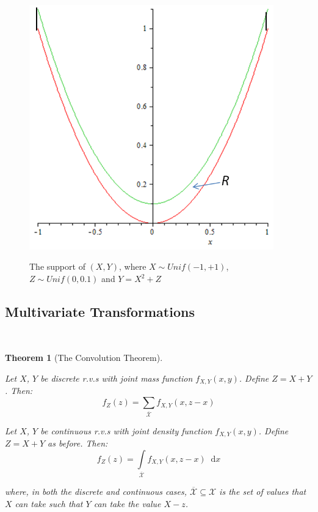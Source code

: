 \documentclass[12pt,a4paper]{article}
\newcommand{\diff}{\;\mathrm{d}}
\newtheorem{thm}{Theorem}[subsection]
\begin{document}
\begin{figure}[h]
\begin{center}
\includegraphics[height=10.58cm,width=10.58cm]{M2S1 Uncorrelated but Dependent.png}\label{figure uncorrelated, dependent}
\caption{The support of $(X,Y)$, where $X \sim Unif(-1,+1)$, $Z \sim Unif(0,0.1)$ and $Y = X^2 + Z$}
\end{center}
\end{figure}

\subsection{Multivariate Transformations}$\;$

\begin{thm}[The Convolution Theorem]$\quad$\par\vspace{1cm}

 Let $X$, $Y$ be discrete r.v.s with joint mass function $f_{X,Y}(x,y)$. Define $Z=X+Y$. Then:
$$f_Z(z) = \sum\limits_{\overline{\mathcal{X}}} f_{X,Y}(x,z-x)$$

 Let $X$, $Y$ be continuous r.v.s with joint density function $f_{X,Y}(x,y)$. Define $Z=X+Y$ as before. Then:
$$f_Z(z) = \int\limits_{\overline{\mathcal{X}}}\!\! f_{X,Y}(x,z-x)\;\diff x$$

\noindent where, in both the discrete and continuous cases, $\overline{\mathcal{X}}\subseteq\mathcal{X}$ is the set of values that $X$ can take such that $Y$ can take the value $X-z$.

\end{thm}
\end{document}
